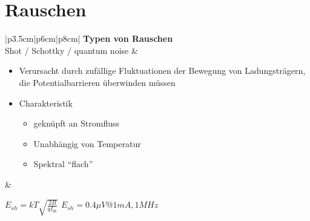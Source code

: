 \section{Rauschen}
\vspace{-3mm}
\begin{longtable}{|p{3.5cm}|p{6cm}|p{8cm}|}
	\hline
    \textbf{Typen von Rauschen}
    \\ \hline
	Shot / Schottky / quantum noise
	& \vspace{-1.5\topsep}
      \begin{itemize}[leftmargin=*]
  		\item Verursacht durch zufällige Fluktuationen der Bewegung von Ladungsträgern, 
        die Potentialbarrieren überwinden müssen
  		\item Charakteristik
  		\begin{itemize}
    		\item geknüpft an Stromfluss
    		\item Unabhängig von Temperatur
    		\item Spektral "`flach"'
    	\end{itemize}
	  \end{itemize}
	& {
		$E_{sh}=kT\sqrt{\frac{2B}{qI_{dc}}}$\newline
		$E_{sh}= 0.4\mu V @ 1mA,1MHz$\newline
        
}
\end{longtable}
